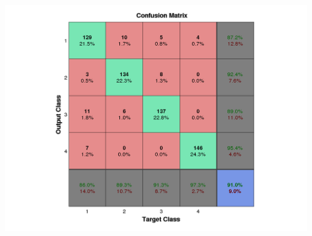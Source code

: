 \documentclass[fleqn]{article}
\begin{document}
\includegraphics[scale=0.3]{./pics/overlapping_data/_14_16/_14_16_epoch_Inf_confusion}
\end{document}
